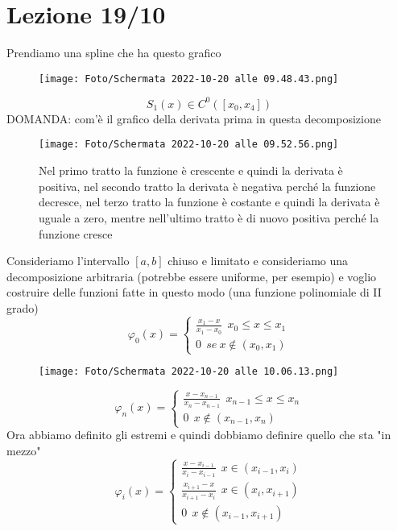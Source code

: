 \documentclass[a4paper, portrait]{book}
\numberwithin{equation}{chapter} %
\begin{document}
\chapter{Lezione 19/10}
Prendiamo una spline che ha questo grafico
\begin{figure}[h!]
    \centering
    \texttt{[image: Foto/Schermata 2022-10-20 alle 09.48.43.png]}
    \caption{}
\end{figure}
\begin{equation}
    S_1(x) \in C^0 ([x_0,x_4])
\end{equation}
DOMANDA: com'è il grafico della derivata prima in questa decomposizione
\begin{figure}[h!]
    \centering
    \texttt{[image: Foto/Schermata 2022-10-20 alle 09.52.56.png]}
    \caption{Nel primo tratto la funzione è crescente e quindi la derivata è positiva, nel secondo tratto la derivata è negativa perché la funzione decresce, nel terzo tratto la funzione è costante e quindi la derivata è uguale a zero, mentre nell'ultimo tratto è di nuovo positiva perché la funzione cresce}
\end{figure}
\newpage
Consideriamo l'intervallo $[a,b]$ chiuso e limitato e consideriamo una decomposizione arbitraria (potrebbe essere uniforme, per esempio) e voglio costruire delle funzioni fatte in questo modo (una funzione polinomiale di II grado)
\begin{equation}
    \varphi_0 (x) = \begin{cases}
        \frac{x_1-x}{x_1-x_0} \ \ x_0\leq x \leq x_1\\
        0 \ \ se \ x \notin (x_0,x_1)
    \end{cases}
\end{equation}
\begin{figure}[h!]
    \centering
    \texttt{[image: Foto/Schermata 2022-10-20 alle 10.06.13.png]}
    \caption{}
\end{figure}
\begin{equation}
    \varphi_n (x) = \begin{cases}
        \frac{x-x_{n-1}}{x_n - x_{n-1}} \ \ x_{n-1}\leq x \leq x_n\\
        0 \ \ x \notin (x_{n-1},x_n)
    \end{cases}
\end{equation}
Ora abbiamo definito gli estremi e quindi dobbiamo definire quello che sta "in mezzo"
\begin{equation}
    \varphi_i(x) = \begin{cases}
        \frac{x-x_{i-1}}{x_i - x_{i-1}} \ \ x \in (x_{i-1},x_i)\\
        \frac{x_{i+1}-x}{x_{i+1}-x_i} \ \ x \in (x_i, x_{i+1})\\
        0 \ \ x \notin (x_{i-1},x_{i+1})
    \end{cases}
\end{equation}
\end{document}
